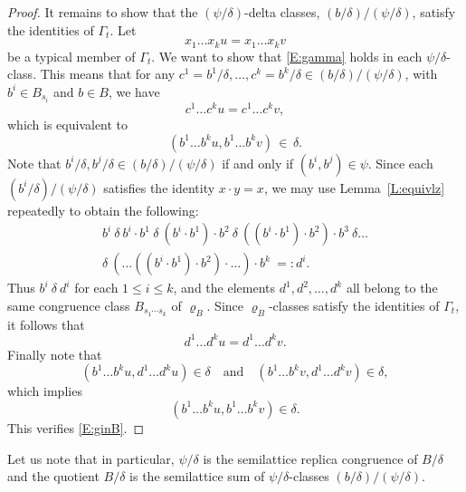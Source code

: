 \documentclass{birkau}
\theoremstyle{plain}
\theoremstyle{definition}
\numberwithin{equation}{section}
\begin{document}
\begin{proof}
It remains to show that the $(\psi/\delta)$-delta classes, $(b/\delta)/(\psi/\delta)$,
satisfy the identities of $\Gamma_t$.  Let
\begin{equation}\label{E:gamma}
x_1 \ldots x_k u = x_1 \ldots x_k v
\end{equation}
be a typical member of $\Gamma_t$.
We want to show that \eqref{E:gamma} holds in each $\psi/\delta$-class. This means that
for any $c^1 = b^1/\delta, \ldots, c^k = b^k/\delta \in (b/\delta)/(\psi/\delta)$, with
$b^i \in B_{s_i}$ and $b \in B$, we have
\begin{equation}\label{E:ginC}
c^1 \ldots c^k u = c^1 \ldots c^k v,
\end{equation}
which is equivalent to
\begin{equation}\label{E:ginB}
(b^1 \ldots b^k u, b^1 \ldots b^k v) \, \in \, \delta.
\end{equation}
Note that $b^i/\delta, b^j/\delta \in (b/\delta)/(\psi/\delta)$ if and only if
$(b^i, b^j) \in \psi$. Since each $(b^i /\delta)/(\psi/\delta)$ satisfies the identity
$x \cdot y = x$, we may use Lemma~\ref{L:equivlz} repeatedly to obtain the following:
\begin{multline*}
b^{i}\ \delta\ b^{i}\cdot b^{1}\ \delta \ (b^{i}\cdot b^{1})\cdot b^{2}\ \delta\ ((b^{i}\cdot b^{1})\cdot b^{2})\cdot b^{3}\ \delta\dots\\
\delta\ (\ldots((b^{i}\cdot b^{1})\cdot b^{2})\cdot \ldots)\cdot b^{k}\ =: d^i.
\end{multline*}
Thus $b^{i}\ \delta\ d^i$ for each $1 \leq i \leq k$, and the elements
$d^1, d^2, \ldots, d^k$ all belong to the same congruence class $B_{s_{1}\cdots s_k}$ of
$\varrho_B$.  Since $\varrho_B$-classes satisfy the identities of $\Gamma_t$, it follows
that
\begin{equation*}
d^1 \ldots d^k u = d^1 \ldots d^k v.
\end{equation*}
Finally note that
\begin{equation*}
(b^1 \ldots b^k u, d^1 \ldots d^k u) \in \delta \quad \mbox{and} \quad (b^1 \ldots b^k v,
d^1 \ldots d^k v) \in \delta,
\end{equation*}
which implies
\begin{equation*}
(b^1 \ldots b^k u, b^1 \ldots b^k v) \in \delta.
\end{equation*}
This verifies \eqref{E:ginB}.
\end{proof}

Let us note that in particular, $\psi/\delta$ is the semilattice replica congruence of $B/\delta$ and the quotient $B/\delta$ is the semilattice sum of $\psi/\delta$-classes $(b/\delta)/(\psi/\delta)$.
\end{document}
